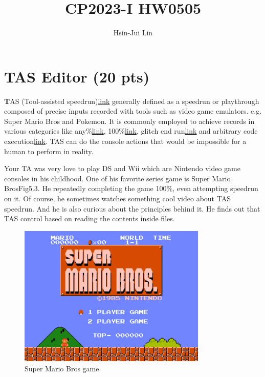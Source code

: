 \documentclass[a4paper,11pt]{article}
\title{CP2023-I HW0505}
\author{Hsin-Jui Lin}
\begin{document}
\maketitle

\section{TAS Editor (20 pts)}
\textbf
TAS (Tool-assisted speedrun){\href{https://en.wikipedia.org/wiki/Tool-assisted_speedrun}{\tiny link}} generally defined as a speedrun or playthrough composed of precise inputs recorded with tools such as video game emulators. e.g. Super Mario Bros and Pokemon. It is commonly employed to achieve records in various categories like any\%{\href{https://www.youtube.com/watch?v=siYert4HOSo}{\tiny link}}, 100\%{\href{https://youtu.be/pn0XyR89ks0?si=MC5ckiuYFDmJ-SKU}{\tiny link}}, glitch end run{\href{https://www.youtube.com/watch?v=FkQdwUns7H8&pp=ygUOZ2xpdGNoIGVuZCB0YXM%3D}{\tiny link}} and arbitrary code execution{\href{https://youtu.be/Vjm8P8utT5g?si=MDABIMjayoT705Dp}{\tiny link}}. TAS can do the console actions that would be impossible for a human to perform in reality.

Your TA was very love to play DS and Wii which are Nintendo video game consoles in his childhood. One of his favorite series game is Super Mario Bros{{\color{blue}\tiny Fig5.3}}. He repeatedly completing the game 100\%, even attempting speedrun on it. Of course, he sometimes watches something cool video about TAS speedrun. And he is also curious about the principles behind it. He finds out that TAS control based on reading the contents inside files.

\begin{figure}[h]
    \centering
    \includegraphics[width=0.8\textwidth]{assets/super-mario-bros.jpg}
    \caption{Super Mario Bros game}
\end{figure}
\end{document}
